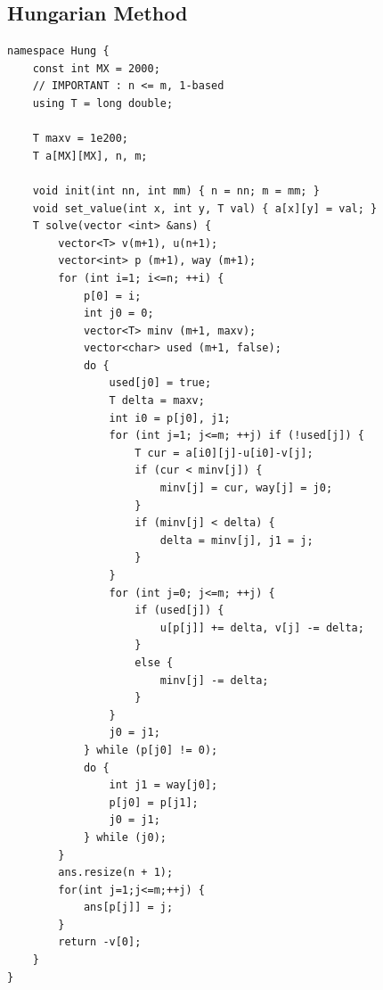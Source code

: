 \documentclass[landscape, 8pt, a4paper, oneside, twocolumn]{extarticle}
\begin{document}
\subsection{Hungarian Method}
\begin{verbatim}
namespace Hung {
    const int MX = 2000;
    // IMPORTANT : n <= m, 1-based
    using T = long double;

    T maxv = 1e200;
    T a[MX][MX], n, m;

    void init(int nn, int mm) { n = nn; m = mm; }
    void set_value(int x, int y, T val) { a[x][y] = val; }
    T solve(vector <int> &ans) {
        vector<T> v(m+1), u(n+1);
        vector<int> p (m+1), way (m+1);
        for (int i=1; i<=n; ++i) {
            p[0] = i;
            int j0 = 0;
            vector<T> minv (m+1, maxv);
            vector<char> used (m+1, false);
            do {
                used[j0] = true;
                T delta = maxv;
                int i0 = p[j0], j1;
                for (int j=1; j<=m; ++j) if (!used[j]) {
                    T cur = a[i0][j]-u[i0]-v[j];
                    if (cur < minv[j]) {
                        minv[j] = cur, way[j] = j0;
                    }
                    if (minv[j] < delta) {
                        delta = minv[j], j1 = j;
                    }
                }
                for (int j=0; j<=m; ++j) {
                    if (used[j]) {
                        u[p[j]] += delta, v[j] -= delta;
                    }
                    else {
                        minv[j] -= delta;
                    }
                }
                j0 = j1;
            } while (p[j0] != 0);
            do {
                int j1 = way[j0];
                p[j0] = p[j1];
                j0 = j1;
            } while (j0);
        }
        ans.resize(n + 1);
        for(int j=1;j<=m;++j) {
            ans[p[j]] = j;
        }
        return -v[0];
    }
}
\end{verbatim}
\end{document}
